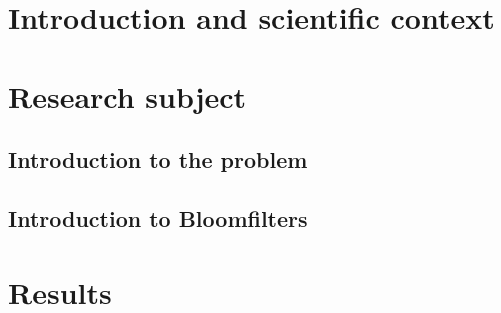 \documentclass[a4paper,10pt]{report}
\theoremstyle{definition}
\theoremstyle{definition}
\begin{document}
\chapter{Introduction and scientific context}
\chapter{Research subject}
\section{Introduction to the problem}

\section{Introduction to Bloomfilters}

\chapter{Results}
\end{document}
